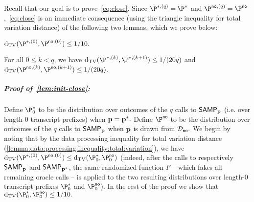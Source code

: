 Recall that our goal is to prove~\cref{eq:close}.
Since
$\P^{\ast,(q)} = \P^\ast$
and $\P^{\text \no, (q)} = \P^{\text \no}$,~\cref{eq:close} is an immediate consequence (using the triangle
inequality for total variation distance) of the following
two lemmas, which we prove below:

\begin{lemma} \label{lem:init-close}
$\dtv(\P^{\ast, (0)},\P^{\text \no , (0)}) \leq 1/10.$
\end{lemma}

\begin{lemma} \label{lem:small-change}
For all $0 \leq k < q$, we have
$\dtv(\P^{\ast,(k)},\P^{\ast, (k+1)}) \leq 1/(20q)$ and
$\dtv(\P^{\text \no, (k)},\P^{\text \no , (k+1) }) \leq 1/(20q)$.
\end{lemma}

\subparagraph{Proof of~\cref{lem:init-close}:}
Define
$\P^\ast_0$ to be the distribution over outcomes of the $q$ calls
to ${\sf SAMP}_{\mathbf{p}}$ (i.e. over length-0 transcript prefixes) when $\mathbf{p}=\mathbf{p}^\ast.$
Define $\P^{\text \no}$
to be the distribution over outcomes of the $q$ calls
to ${\sf SAMP}_{\mathbf{p}}$
when $\mathbf{p}$ is drawn from $\mathcal{D}_{\textsf{no}}.$
We begin by noting that by the data processing inequality
for total variation distance (\cref{lemma:data:processing:inequality:total:variation}), we have
$\dtv(\P^{\ast,(0)},\P^{\text \no,(0)}) \leq
\dtv(\P^\ast_0, \P^{\text \no}_0)$ {(indeed, after the calls to respectively ${\sf SAMP}_{\mathbf{p}}$
and ${\sf SAMP}_{\mathbf{p}^\ast}$, the same randomized function $F$ -- which fakes all remaining oracle calls -- is applied to the two resulting distributions over length-0 transcript prefixes $\P^\ast_0$ and $\P^{\text \no}_0$)}. In the rest of the proof we show that $\dtv(\P^\ast_0, \P^{\text \no}_0) \leq 1/10.$

